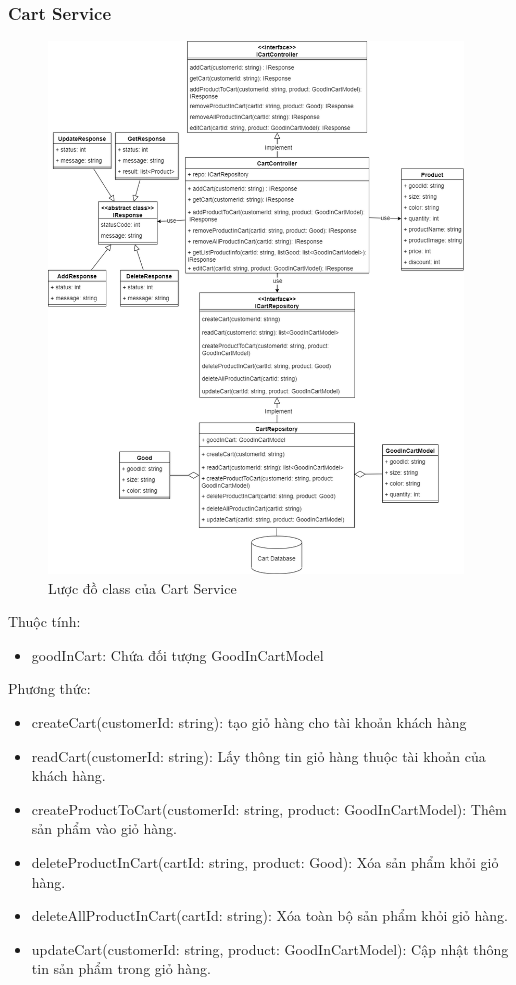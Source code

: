 \subsubsection{Cart Service}
\begin{figure}[!htp]
	\centering
	\includegraphics[width=11cm]{img/Architecture/service/CartService.png}
	\newline
	\caption{Lược đồ class của Cart Service}
\end{figure}

	Thuộc tính:
	\begin{itemize}
		\item goodInCart: Chứa đối tượng GoodInCartModel
	\end{itemize}
	Phương thức:
	\begin{itemize}
		\item createCart(customerId: string): tạo giỏ hàng cho tài khoản khách hàng
		\item readCart(customerId: string): Lấy thông tin giỏ hàng thuộc tài khoản của khách hàng.
		\item createProductToCart(customerId: string, product: GoodInCartModel): Thêm sản phẩm vào giỏ hàng.
		\item deleteProductInCart(cartId: string, product: Good): Xóa sản phẩm khỏi giỏ hàng.
		\item deleteAllProductInCart(cartId: string): Xóa toàn bộ sản phẩm khỏi giỏ hàng.
		\item updateCart(customerId: string, product: GoodInCartModel): Cập nhật thông tin sản phẩm trong giỏ hàng.
	\end{itemize}

